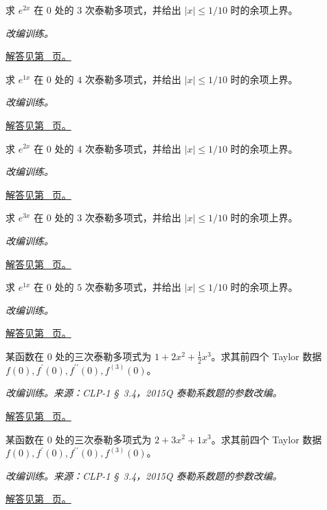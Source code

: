 \documentclass[12pt,fontset=fandol]{ctexart}
\begin{document}
\begin{example}[指数函数的泰勒多项式与余项]\label{ex:c10q15}
求 $e^{2x}$ 在 $0$ 处的 $3$ 次泰勒多项式，并给出 $|x|\le1/10$ 时的余项上界。
\par\textit{改编训练。}\par\hyperref[ans:c10q15]{解答见第~\pageref{ans:c10q15} 页。}
\end{example}
\begin{example}[指数函数的泰勒多项式与余项]\label{ex:c10q16}
求 $e^{1x}$ 在 $0$ 处的 $4$ 次泰勒多项式，并给出 $|x|\le1/10$ 时的余项上界。
\par\textit{改编训练。}\par\hyperref[ans:c10q16]{解答见第~\pageref{ans:c10q16} 页。}
\end{example}
\begin{example}[指数函数的泰勒多项式与余项]\label{ex:c10q17}
求 $e^{2x}$ 在 $0$ 处的 $4$ 次泰勒多项式，并给出 $|x|\le1/10$ 时的余项上界。
\par\textit{改编训练。}\par\hyperref[ans:c10q17]{解答见第~\pageref{ans:c10q17} 页。}
\end{example}
\begin{example}[指数函数的泰勒多项式与余项]\label{ex:c10q18}
求 $e^{3x}$ 在 $0$ 处的 $3$ 次泰勒多项式，并给出 $|x|\le1/10$ 时的余项上界。
\par\textit{改编训练。}\par\hyperref[ans:c10q18]{解答见第~\pageref{ans:c10q18} 页。}
\end{example}
\begin{example}[指数函数的泰勒多项式与余项]\label{ex:c10q19}
求 $e^{1x}$ 在 $0$ 处的 $5$ 次泰勒多项式，并给出 $|x|\le1/10$ 时的余项上界。
\par\textit{改编训练。}\par\hyperref[ans:c10q19]{解答见第~\pageref{ans:c10q19} 页。}
\end{example}
\begin{example}[由泰勒系数恢复导数]\label{ex:c10q20}
某函数在 $0$ 处的三次泰勒多项式为 $1+2x^2+\frac{1}{2}x^3$。求其前四个 Taylor 数据 $f(0),f^{\prime}(0),f^{\prime\prime}(0),f^{(3)}(0)$。
\par\textit{改编训练。来源：CLP-1 \S~3.4，2015Q 泰勒系数题的参数改编。}\par\hyperref[ans:c10q20]{解答见第~\pageref{ans:c10q20} 页。}
\end{example}
\begin{example}[由泰勒系数恢复导数]\label{ex:c10q21}
某函数在 $0$ 处的三次泰勒多项式为 $2+3x^2+1x^3$。求其前四个 Taylor 数据 $f(0),f^{\prime}(0),f^{\prime\prime}(0),f^{(3)}(0)$。
\par\textit{改编训练。来源：CLP-1 \S~3.4，2015Q 泰勒系数题的参数改编。}\par\hyperref[ans:c10q21]{解答见第~\pageref{ans:c10q21} 页。}
\end{example}
\end{document}
